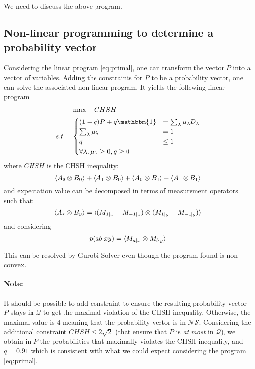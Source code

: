 \documentclass[12pt]{article}
\newcommand{\NS}{\mathcal{NS}}
\newcommand{\Q}{\mathcal{Q}}
\newcommand{\note}{\paragraph{Note:}}
\begin{document}
\begin{multicols}{2}
We need to discuss the above program.

\subsection*{Non-linear programming to determine a probability vector}
Considering the linear program \ref{eq:primal}, one can transform the vector $P$
into a vector of variables. Adding the constraints for $P$ to be a probability
vector, one can solve the associated non-linear program. It yields the following
linear program
\begin{equation} \label{eq:primal-nl}
	\begin{aligned}
					& \max \quad CHSH\\
		s.t. \quad  &
			\begin{cases}
		 			(1-q) P + q \mathbbm{1}  & = \sum_\lambda \mu_\lambda D_\lambda \\
					\sum_\lambda \mu_\lambda & = 1 \\
					q & \leq 1 \\
					\forall \lambda, \mu_\lambda \geq 0, q \geq 0
				\end{cases}
	\end{aligned}
\end{equation}
where $CHSH$ is the CHSH inequality:
\begin{equation}
	\braket{A_0 \otimes B_0} + \braket{A_1 \otimes B_0} + \braket{A_0 \otimes B_1} - \braket{A_1 \otimes B_1}
\end{equation}
and expectation value can be decomposed in terms of measurement operators such that:
\begin{equation}
	\braket{A_x \otimes B_y} = \braket{(M_{1|x} - M_{-1|x})\otimes(M_{1|y} - M_{-1|y})}
\end{equation}
and considering
\begin{equation}
	p(ab|xy) = \braket{M_{a|x} \otimes M_{b|y}}
\end{equation}

This can be resolved by Gurobi Solver \cite{gurobi} even though the program
found is non-convex.

\note It should be possible to add constraint to ensure the resulting
probability vector $P$ stays in $\Q$ to get the maximal violation of the CHSH
inequality. Otherwise, the maximal value is $4$ meaning that the probability
vector is in $\NS$. Considering the additional constraint $CHSH \leq 2 \sqrt 2$
(that ensure that $P$ is \textit{at most} in $\Q$), we obtain in $P$ the
probabilities that maximally violates the CHSH inequality, and $q = 0.91$ which
is consistent with what we could expect considering the program
\ref*{eq:primal}.




\end{multicols}
\end{document}

